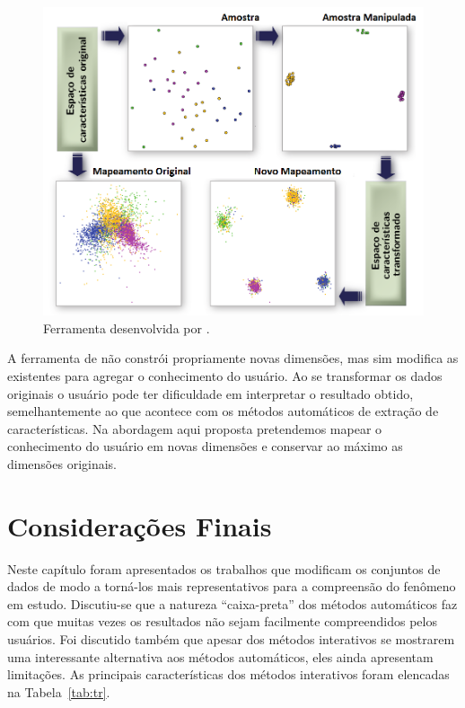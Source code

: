\begin{figure}[h!]
    \centering
    \includegraphics[width=16cm]{images/ud.png}
    \caption{Ferramenta desenvolvida por \citet{Gladys2013}.}
    \label{fig:ud}
\end{figure}

A ferramenta de \citet{Gladys2013} não constrói propriamente 
novas dimensões, mas sim modifica as
existentes para agregar o conhecimento do usuário. Ao se
transformar os dados originais o usuário pode ter
dificuldade em interpretar o resultado obtido,
semelhantemente ao que acontece com os métodos automáticos
de extração de características. Na abordagem aqui proposta
pretendemos mapear o conhecimento do usuário em novas
dimensões e conservar ao máximo as dimensões originais.

\section{Considerações Finais}

Neste capítulo foram apresentados os trabalhos que modificam
os conjuntos de dados de modo a torná-los mais
representativos para a compreensão do fenômeno em estudo.
Discutiu-se que a natureza ``caixa-preta'' dos métodos
automáticos faz com que muitas vezes os resultados não sejam
facilmente compreendidos pelos usuários. Foi discutido também que
apesar dos métodos interativos se mostrarem uma
interessante alternativa aos métodos automáticos, eles ainda
apresentam limitações. As principais características dos
métodos interativos foram elencadas na Tabela~\ref{tab:tr}.

